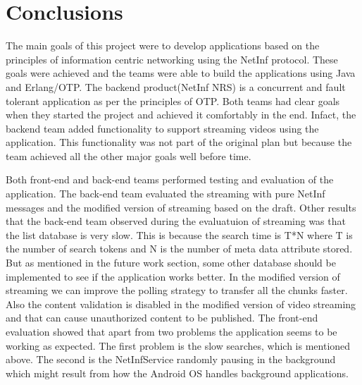 \section{Conclusions}
The main goals of this project were to develop applications based on the principles of information centric networking using the NetInf protocol. These goals were achieved and the teams were able to build the applications using Java and Erlang/OTP. The backend product(NetInf NRS) is a concurrent and fault tolerant application as per the principles of OTP. Both teams had clear goals when they started the project and achieved it comfortably in the end. Infact, the backend team added functionality to support streaming videos using the application. This functionality was not part of the original plan but because the team achieved all the other major goals well before time.

Both front-end and back-end teams performed testing and evaluation of the application. The back-end team evaluated the streaming with pure NetInf messages and the modified version of streaming based on the draft. Other results that the back-end team observed during the evaluatuion of streaming was that the list database is very slow. This is because the search time is T*N where T is the number of search tokens and N is the number of meta data attribute stored. But as mentioned in the future work section, some other database should be implemented to see if the application works better. In the modified version of streaming we can improve the polling strategy to transfer all the chunks faster. Also the content validation is disabled in the modified version of video streaming and that can cause unauthorized content to be published. The front-end evaluation showed that apart from two problems the application seems to be working as expected. The first problem is the slow searches, which is mentioned above. The second is the NetInfService randomly pausing in the background which might result from how the Android OS handles background applications.

 
